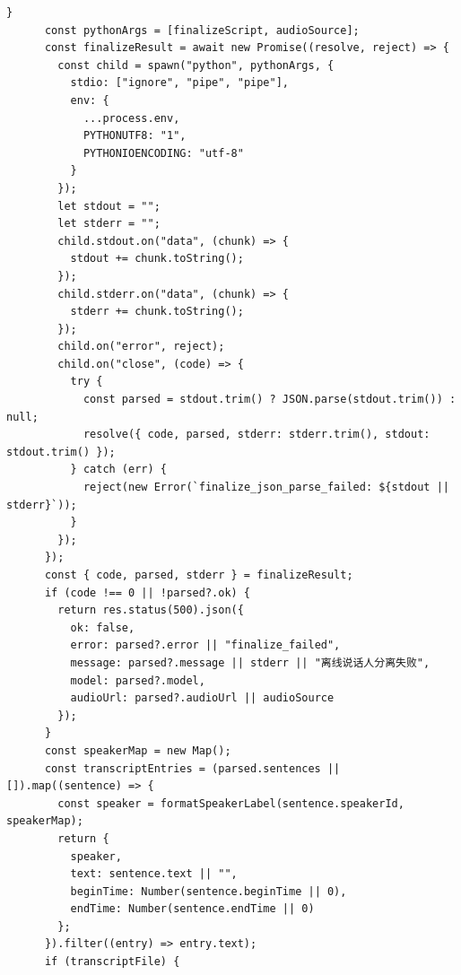 \documentclass[12pt,a4paper]{article}
\begin{document}
\begin{Verbatim}[fontsize=\footnotesize]
      }
      const pythonArgs = [finalizeScript, audioSource];
      const finalizeResult = await new Promise((resolve, reject) => {
        const child = spawn("python", pythonArgs, {
          stdio: ["ignore", "pipe", "pipe"],
          env: {
            ...process.env,
            PYTHONUTF8: "1",
            PYTHONIOENCODING: "utf-8"
          }
        });
        let stdout = "";
        let stderr = "";
        child.stdout.on("data", (chunk) => {
          stdout += chunk.toString();
        });
        child.stderr.on("data", (chunk) => {
          stderr += chunk.toString();
        });
        child.on("error", reject);
        child.on("close", (code) => {
          try {
            const parsed = stdout.trim() ? JSON.parse(stdout.trim()) : null;
            resolve({ code, parsed, stderr: stderr.trim(), stdout: stdout.trim() });
          } catch (err) {
            reject(new Error(`finalize_json_parse_failed: ${stdout || stderr}`));
          }
        });
      });
      const { code, parsed, stderr } = finalizeResult;
      if (code !== 0 || !parsed?.ok) {
        return res.status(500).json({
          ok: false,
          error: parsed?.error || "finalize_failed",
          message: parsed?.message || stderr || "离线说话人分离失败",
          model: parsed?.model,
          audioUrl: parsed?.audioUrl || audioSource
        });
      }
      const speakerMap = new Map();
      const transcriptEntries = (parsed.sentences || []).map((sentence) => {
        const speaker = formatSpeakerLabel(sentence.speakerId, speakerMap);
        return {
          speaker,
          text: sentence.text || "",
          beginTime: Number(sentence.beginTime || 0),
          endTime: Number(sentence.endTime || 0)
        };
      }).filter((entry) => entry.text);
      if (transcriptFile) {
\end{Verbatim}
\newpage
{}
\fancyhead[R]{}
\end{document}

